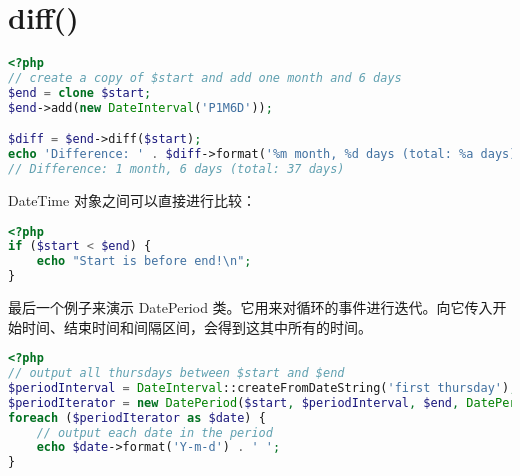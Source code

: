 \section{diff()}


\begin{lstlisting}[language=PHP]
<?php
// create a copy of $start and add one month and 6 days
$end = clone $start;
$end->add(new DateInterval('P1M6D'));

$diff = $end->diff($start);
echo 'Difference: ' . $diff->format('%m month, %d days (total: %a days)') . "\n";
// Difference: 1 month, 6 days (total: 37 days)
\end{lstlisting}

DateTime 对象之间可以直接进行比较：



\begin{lstlisting}[language=PHP]
<?php
if ($start < $end) {
    echo "Start is before end!\n";
}
\end{lstlisting}

最后一个例子来演示 DatePeriod 类。它用来对循环的事件进行迭代。向它传入开始时间、结束时间和间隔区间，会得到这其中所有的时间。



\begin{lstlisting}[language=PHP]
<?php
// output all thursdays between $start and $end
$periodInterval = DateInterval::createFromDateString('first thursday');
$periodIterator = new DatePeriod($start, $periodInterval, $end, DatePeriod::EXCLUDE_START_DATE);
foreach ($periodIterator as $date) {
    // output each date in the period
    echo $date->format('Y-m-d') . ' ';
}
\end{lstlisting}



\begin{lstlisting}[language=PHP]

\end{lstlisting}



\begin{lstlisting}[language=PHP]

\end{lstlisting}




\begin{lstlisting}[language=PHP]

\end{lstlisting}




\begin{lstlisting}[language=PHP]

\end{lstlisting}


